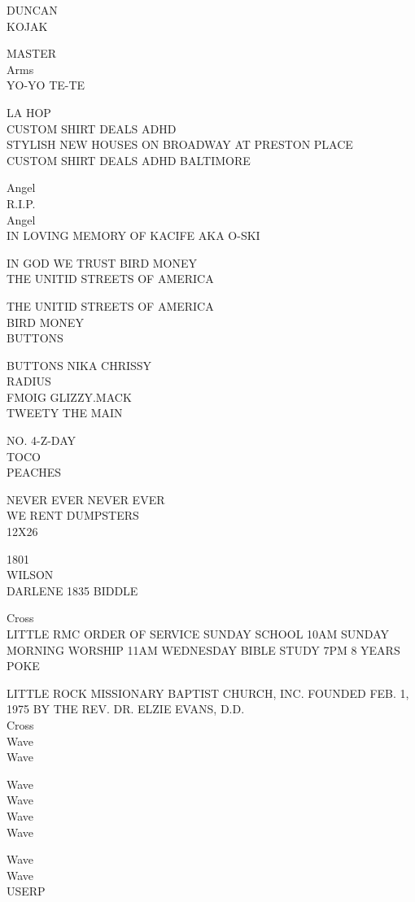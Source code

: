 \documentclass[10pt,letterpaper]{article}
\begin{document}
DUNCAN\\
KOJAK

MASTER\\
Arms\\
YO{-}YO TE{-}TE

LA HOP\\
CUSTOM SHIRT DEALS ADHD\\
STYLISH NEW HOUSES ON BROADWAY AT PRESTON PLACE\\
CUSTOM SHIRT DEALS ADHD BALTIMORE

Angel\\
R.I.P.\\
Angel\\
IN LOVING MEMORY OF KACIFE AKA O{-}SKI

IN GOD WE TRUST BIRD MONEY\\
THE UNITID STREETS OF AMERICA

THE UNITID STREETS OF AMERICA\\
BIRD MONEY\\
BUTTONS

BUTTONS NIKA CHRISSY\\
RADIUS\\
FMOIG GLIZZY.MACK\\
TWEETY THE MAIN

NO. 4{-}Z{-}DAY\\
TOCO\\
PEACHES

NEVER EVER NEVER EVER\\
WE RENT DUMPSTERS\\
12X26

1801\\
WILSON\\
DARLENE 1835 BIDDLE

Cross\\
LITTLE RMC ORDER OF SERVICE SUNDAY SCHOOL 10AM SUNDAY MORNING WORSHIP 11AM WEDNESDAY BIBLE STUDY 7PM 8 YEARS\\
POKE

LITTLE ROCK MISSIONARY BAPTIST CHURCH, INC. FOUNDED FEB. 1, 1975 BY THE REV. DR. ELZIE EVANS, D.D.\\
Cross\\
Wave\\
Wave

Wave\\
Wave\\
Wave\\
Wave

Wave\\
Wave\\
USERP
\end{document}
